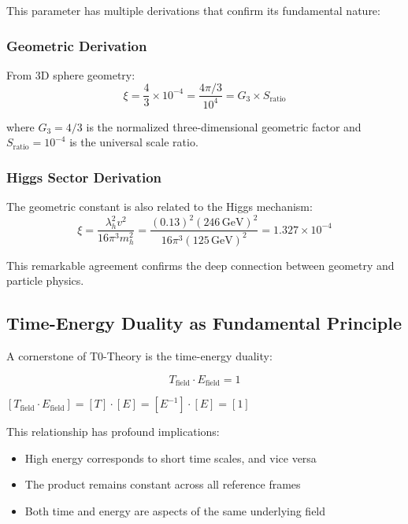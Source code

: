 \documentclass[12pt,a4paper]{article}
\theoremstyle{definition}
\begin{document}
This parameter has multiple derivations that confirm its fundamental nature:

\subsubsection{Geometric Derivation}
From 3D sphere geometry:
\begin{equation}
	\xi = \frac{4}{3} \times 10^{-4} = \frac{4\pi/3}{10^4} = G_3 \times S_{\text{ratio}}
\end{equation}

where $G_3 = 4/3$ is the normalized three-dimensional geometric factor and $S_{\text{ratio}} = 10^{-4}$ is the universal scale ratio.

\subsubsection{Higgs Sector Derivation}
The geometric constant is also related to the Higgs mechanism:
\begin{equation}
	\xi = \frac{\lambda_h^2 v^2}{16\pi^3 m_h^2} = \frac{(0.13)^2 (246\,\text{GeV})^2}{16\pi^3 (125\,\text{GeV})^2} = 1.327 \times 10^{-4}
\end{equation}

This remarkable agreement confirms the deep connection between geometry and particle physics.

\subsection{Time-Energy Duality as Fundamental Principle}

A cornerstone of T0-Theory is the time-energy duality:

\begin{equation}
	\boxed{T_{\text{field}} \cdot E_{\text{field}} = 1}
\end{equation}

\begin{einheitencheck}
	$[T_{\text{field}} \cdot E_{\text{field}}] = [T] \cdot [E] = [E^{-1}] \cdot [E] = [1]$ \checkmark
\end{einheitencheck}

This relationship has profound implications:
\begin{itemize}
	\item High energy corresponds to short time scales, and vice versa
	\item The product remains constant across all reference frames
	\item Both time and energy are aspects of the same underlying field
\end{itemize}
\end{document}

